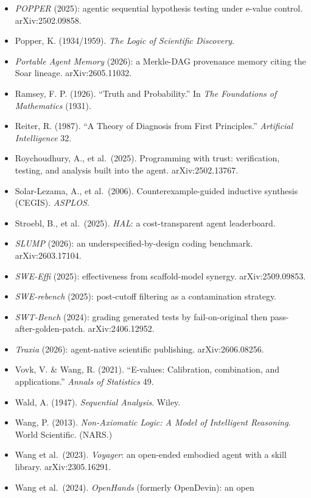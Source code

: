 \documentclass[
  10pt,
]{article}
\begin{document}
\begin{itemize}
  (Harvard Lectures on Pragmatism).
\item
  \emph{POPPER} (2025): agentic sequential hypothesis testing under
  e-value control. arXiv:2502.09858.
\item
  Popper, K. (1934/1959). \emph{The Logic of Scientific Discovery}.
\item
  \emph{Portable Agent Memory} (2026): a Merkle-DAG provenance memory
  citing the Soar lineage. arXiv:2605.11032.
\item
  Ramsey, F. P. (1926). ``Truth and Probability.'' In \emph{The
  Foundations of Mathematics} (1931).
\item
  Reiter, R. (1987). ``A Theory of Diagnosis from First Principles.''
  \emph{Artificial Intelligence} 32.
\item
  Roychoudhury, A., et al.~(2025). Programming with trust: verification,
  testing, and analysis built into the agent. arXiv:2502.13767.
\item
  Solar-Lezama, A., et al.~(2006). Counterexample-guided inductive
  synthesis (CEGIS). \emph{ASPLOS}.
\item
  Stroebl, B., et al.~(2025). \emph{HAL}: a cost-transparent agent
  leaderboard.
\item
  \emph{SLUMP} (2026): an underspecified-by-design coding benchmark.
  arXiv:2603.17104.
\item
  \emph{SWE-Effi} (2025): effectiveness from scaffold-model synergy.
  arXiv:2509.09853.
\item
  \emph{SWE-rebench} (2025): post-cutoff filtering as a contamination
  strategy.
\item
  \emph{SWT-Bench} (2024): grading generated tests by fail-on-original
  then pass-after-golden-patch. arXiv:2406.12952.
\item
  \emph{Traxia} (2026): agent-native scientific publishing.
  arXiv:2606.08256.
\item
  Vovk, V. \& Wang, R. (2021). ``E-values: Calibration, combination, and
  applications.'' \emph{Annals of Statistics} 49.
\item
  Wald, A. (1947). \emph{Sequential Analysis}. Wiley.
\item
  Wang, P. (2013). \emph{Non-Axiomatic Logic: A Model of Intelligent
  Reasoning}. World Scientific. (NARS.)
\item
  Wang et al.~(2023). \emph{Voyager}: an open-ended embodied agent with
  a skill library. arXiv:2305.16291.
\item
  Wang et al.~(2024). \emph{OpenHands} (formerly OpenDevin): an open

\end{itemize}
\end{document}
